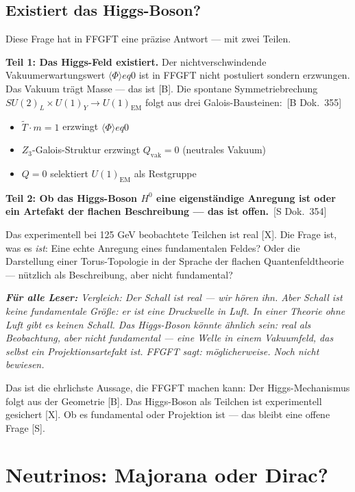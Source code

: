 \documentclass[11pt,oneside]{book}
\newcommand{\status}[1]{\penalty10000\,{\scriptsize\textcolor{gray!60}{[#1]}}}
\newenvironment{laierspur}{%
  \par\vspace{4pt}%
  \noindent\small\itshape\color{blue!60!black}%
  \textbf{Für alle Leser:}\enspace\ignorespaces}{%
  \par\vspace{4pt}\normalsize\normalfont\normalcolor}
\begin{document}
\section*{Existiert das Higgs-Boson?}

Diese Frage hat in FFGFT eine präzise Antwort --- mit zwei Teilen.

\textbf{Teil 1: Das Higgs-Feld existiert.} Der nichtverschwindende
Vakuumerwartungswert $\langle\Phi\rangle 
eq 0$ ist in FFGFT nicht
postuliert sondern erzwungen. Das Vakuum trägt Masse --- das ist
[B]. Die spontane Symmetriebrechung
$SU(2)_L \times U(1)_Y \to U(1)_\text{EM}$ folgt aus drei
Galois-Bausteinen: \status{B Dok.~355}
\begin{itemize}
  \item $\tilde{T}\cdot m=1$ erzwingt $\langle\Phi\rangle 
eq 0$
  \item $Z_3$-Galois-Struktur erzwingt $Q_\text{vak}=0$ (neutrales Vakuum)
  \item $Q=0$ selektiert $U(1)_\text{EM}$ als Restgruppe
\end{itemize}

\textbf{Teil 2: Ob das Higgs-Boson $H^0$ eine eigenständige Anregung
ist oder ein Artefakt der flachen Beschreibung --- das ist offen.}
\status{S Dok.~354}

Das experimentell bei 125 GeV beobachtete Teilchen ist real [X].
Die Frage ist, was es \textit{ist}: Eine echte Anregung eines
fundamentalen Feldes? Oder die Darstellung einer Torus-Topologie in
der Sprache der flachen Quantenfeldtheorie --- nützlich als
Beschreibung, aber nicht fundamental?

\begin{laierspur}
Vergleich: Der Schall ist real --- wir hören ihn. Aber Schall ist
keine fundamentale Größe: er ist eine Druckwelle in Luft. In einer
Theorie ohne Luft gibt es keinen Schall. Das Higgs-Boson könnte
ähnlich sein: real als Beobachtung, aber nicht fundamental --- eine
Welle in einem Vakuumfeld, das selbst ein Projektionsartefakt ist.
FFGFT sagt: möglicherweise. Noch nicht bewiesen.
\end{laierspur}

Das ist die ehrlichste Aussage, die FFGFT machen kann: Der
Higgs-Mechanismus folgt aus der Geometrie [B]. Das Higgs-Boson
als Teilchen ist experimentell gesichert [X]. Ob es fundamental
oder Projektion ist --- das bleibt eine offene Frage [S].

\chapter{Neutrinos: Majorana oder Dirac?}
\end{document}
